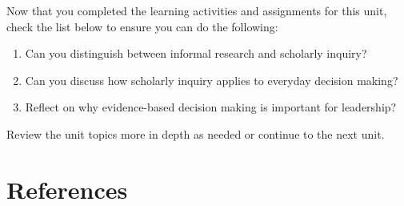 \documentclass[
  letterpaper,
  DIV=11,
  numbers=noendperiod]{scrreprt}
\providecommand{\tightlist}{%
  \setlength{\itemsep}{0pt}\setlength{\parskip}{0pt}}\usepackage{longtable,booktabs,array}
\begin{document}

Now that you completed the learning activities and assignments for this
unit, check the list below to ensure you can do the following:

\begin{enumerate}
\def\labelenumi{\arabic{enumi}.}
\tightlist
\item
  Can you distinguish between informal research and scholarly inquiry?
\item
  Can you discuss how scholarly inquiry applies to everyday decision
  making?
\item
  Reflect on why evidence-based decision making is important for
  leadership?
\end{enumerate}

Review the unit topics more in depth as needed or continue to the next
unit.

\section*{References}\label{references}

\end{document}
